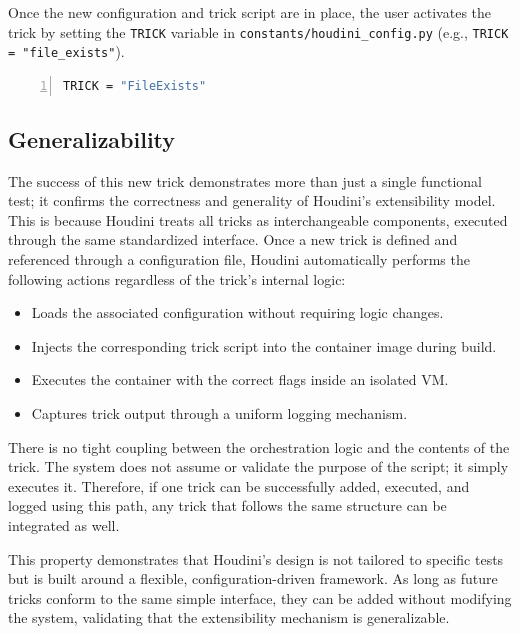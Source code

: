 \documentclass[12pt]{report}
\begin{document}
\begin{doublespace}
Once the new configuration and trick script are in place, the user activates the trick by setting the \texttt{TRICK} variable in \texttt{constants/houdini\_config.py} (e.g., \texttt{TRICK = "file\_exists"}). 

\begin{lstlisting}[language=bash, caption={Trick Configuration Parameters}, label={lst:escape-trick}, numbers=left, numberstyle=\tiny, stepnumber=1, frame=single, breaklines=true, backgroundcolor=\color{gray!10}, basicstyle=\ttfamily\footnotesize, showspaces=false, showstringspaces=false]
TRICK = "FileExists"
\end{lstlisting}

\subsection*{Generalizability}

The success of this new trick demonstrates more than just a single functional test; it confirms the correctness and generality of Houdini’s extensibility model. This is because Houdini treats all tricks as interchangeable components, executed through the same standardized interface. Once a new trick is defined and referenced through a configuration file, Houdini automatically performs the following actions regardless of the trick’s internal logic:

\begin{itemize}
\item Loads the associated configuration without requiring logic changes.
\item Injects the corresponding trick script into the container image during build.
\item Executes the container with the correct flags inside an isolated VM.
\item Captures trick output through a uniform logging mechanism.
\end{itemize}

There is no tight coupling between the orchestration logic and the contents of the trick. The system does not assume or validate the purpose of the script; it simply executes it. Therefore, if one trick can be successfully added, executed, and logged using this path, any trick that follows the same structure can be integrated as well.

This property demonstrates that Houdini’s design is not tailored to specific tests but is built around a flexible, configuration-driven framework. As long as future tricks conform to the same simple interface, they can be added without modifying the system, validating that the extensibility mechanism is generalizable.


\end{doublespace}
\end{document}
